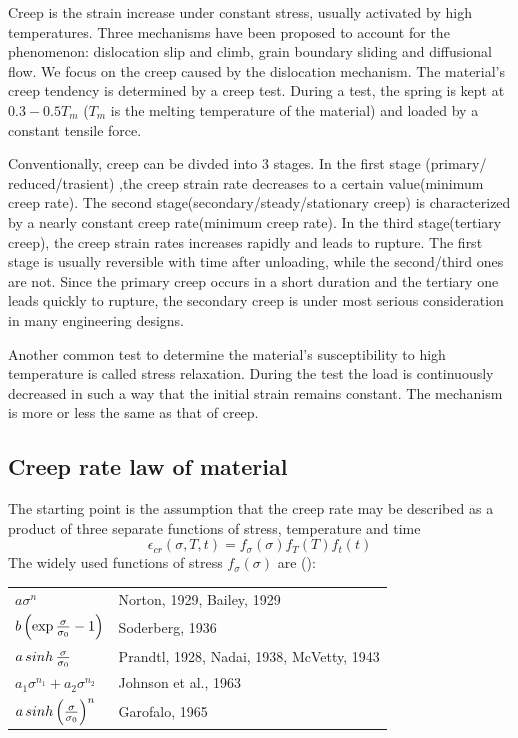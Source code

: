 \documentclass[10pt]{article}
\begin{document}
Creep is the strain increase under constant stress, usually activated by high temperatures. Three mechanisms have been proposed to account for the phenomenon: dislocation slip and climb, grain boundary sliding and diffusional flow. We focus on the creep caused by the dislocation mechanism. The material's creep tendency is determined by a creep test. During a test, the spring is kept at $0.3-0.5T_m$ ($T_m$ is the melting temperature of the material) and loaded by a constant tensile force.

Conventionally, creep can be divded into $3$ stages. In the first stage (primary/ reduced/trasient) ,the creep strain rate decreases to a certain value(minimum creep rate). The second stage(secondary/steady/stationary creep) is characterized by a nearly constant creep rate(minimum creep rate). In the third stage(tertiary creep), the creep strain rates increases rapidly and leads to rupture. The first stage is usually reversible with time after unloading, while the second/third ones are not. Since the primary creep occurs in a short duration and the tertiary one leads quickly to rupture, the secondary creep is under most serious consideration in many engineering designs.

Another common test to determine the material's susceptibility to high temperature is called stress relaxation. During the test the load is continuously decreased in such a way that the initial strain remains constant. The mechanism is more or less the same as that of creep.

\subsection{Creep rate law of material}
\label{sec:Creep}
The starting point is the assumption that the creep rate may be described as a product of three separate functions of stress, temperature and time
\[
\epsilon_{cr}(\sigma,T,t)=f_\sigma (\sigma) f_T(T) f_t(t)
\]
The widely used functions of stress $f_\sigma(\sigma)$ are (\cite{NaKo2006}):

\begin{tabular}{ll}
$a\sigma^n$ & Norton, 1929, Bailey, 1929 \\
$b\left( \exp{\sigma\over \sigma_0} -1 \right)$ & Soderberg, 1936 \\
$a\mathop{sinh}{\sigma\over \sigma_0}$ & Prandtl, 1928, Nadai, 1938, McVetty, 1943\\
$a_1\sigma^{n_1} + a_2 \sigma^{n_2}$ & Johnson et al., 1963 \\
$a\mathop{sinh} \left( {\sigma\over \sigma_0}\right)^n$ & Garofalo, 1965
\end{tabular}
\end{document}
